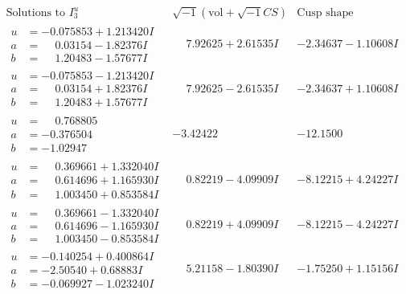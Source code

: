 \documentclass[1p]{elsarticle_modified}
\theoremstyle{definition}
\newcommand{\I}{\sqrt{-1}}
\begin{document}
$$\begin{array}{c|c|c}  
\text{Solutions to }I^u_{3}& \I (\text{vol} + \sqrt{-1}CS) & \text{Cusp shape}\\
 \hline 
\begin{aligned}
u &= -0.075853 + 1.213420 I \\
a &= \phantom{-}0.03154 - 1.82376 I \\
b &= \phantom{-}1.20483 - 1.57677 I\end{aligned}
 & \phantom{-}7.92625 + 2.61535 I & -2.34637 - 1.10608 I \\ \hline\begin{aligned}
u &= -0.075853 - 1.213420 I \\
a &= \phantom{-}0.03154 + 1.82376 I \\
b &= \phantom{-}1.20483 + 1.57677 I\end{aligned}
 & \phantom{-}7.92625 - 2.61535 I & -2.34637 + 1.10608 I \\ \hline\begin{aligned}
u &= \phantom{-}0.768805\phantom{ +0.000000I} \\
a &= -0.376504\phantom{ +0.000000I} \\
b &= -1.02947\phantom{ +0.000000I}\end{aligned}
 & -3.42422\phantom{ +0.000000I} & -12.1500\phantom{ +0.000000I} \\ \hline\begin{aligned}
u &= \phantom{-}0.369661 + 1.332040 I \\
a &= \phantom{-}0.614696 + 1.165930 I \\
b &= \phantom{-}1.003450 + 0.853584 I\end{aligned}
 & \phantom{-}0.82219 - 4.09909 I & -8.12215 + 4.24227 I \\ \hline\begin{aligned}
u &= \phantom{-}0.369661 - 1.332040 I \\
a &= \phantom{-}0.614696 - 1.165930 I \\
b &= \phantom{-}1.003450 - 0.853584 I\end{aligned}
 & \phantom{-}0.82219 + 4.09909 I & -8.12215 - 4.24227 I \\ \hline\begin{aligned}
u &= -0.140254 + 0.400864 I \\
a &= -2.50540 + 0.68883 I \\
b &= -0.069927 - 1.023240 I\end{aligned}
 & \phantom{-}5.21158 - 1.80390 I & -1.75250 + 1.15156 I \\ \hline\begin{aligned}

\end{aligned}
\end{array}$$
\end{document}
